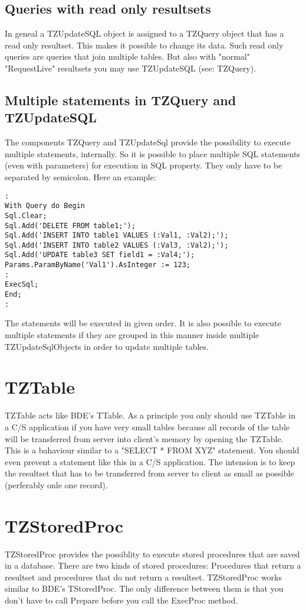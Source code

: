 \documentclass[a4paper,12pt,oneside]{book}
\begin{document}
\subsection{Queries with read only resultsets}
In geneal a TZUpdateSQL object is assigned to a TZQuery object that has a read only resultset.
This makes it possible to change its data.
Such read only queries are queries that join multiple tables.
But also with "normal" "RequestLive" resultsets you may use TZUpdateSQL (see: TZQuery).

\subsection{Multiple statements in TZQuery and TZUpdateSQL}
The components TZQuery and TZUpdateSql provide the possibility to execute multiple statements, internally.
So it is possible to place multiple SQL statements (even with parameters) for execution in SQL property.
They only have to be separated by semicolon. Here an example:
\begin{verbatim}
:
With Query do Begin
Sql.Clear;
Sql.Add('DELETE FROM table1;');
Sql.Add('INSERT INTO table1 VALUES (:Val1, :Val2);');
Sql.Add('INSERT INTO table2 VALUES (:Val3, :Val2);');
Sql.Add('UPDATE table3 SET field1 = :Val4;');
Params.ParamByName('Val1').AsInteger := 123;
:
ExecSql;
End;
:
\end{verbatim}

The statements will be executed in given order.
It is also possible to execute multiple statements if they are grouped in this manner inside multiple TZUpdateSqlObjects in order to update multiple tables.

\section{TZTable}
TZTable acts like BDE's TTable.
As a principle you only should use TZTable in a C/S application if you have very small tables because all records of the table will be transferred from server into client's memory by
opening the TZTable.
This is a bahaviour similar to a "SELECT * FROM XYZ" statement.
You should even prevent a statement like this in a C/S application.
The intension is to keep the resultset that has to be transferred from server to client as small as possible (perferably onle one record).

\section{TZStoredProc}
TZStoredProc provides the possiblity to execute stored procedures that are saved in a database.
There are two kinds of stored procedures: Procedures that return a resultset and procedures that do not return a resultset.
TZStoredProc works similar to BDE's TStoredProc.
The only difference between them is that you don't have to call Prepare before you call the ExecProc method.
\end{document}
